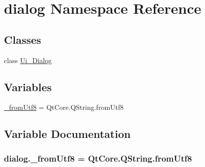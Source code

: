 \hypertarget{namespacedialog}{}\section{dialog Namespace Reference}
\label{namespacedialog}
\subsection*{Classes}
\begin{DoxyCompactItemize}
\item 
class \hyperlink{classdialog_1_1Ui__Dialog}{Ui\+\_\+\+Dialog}
\end{DoxyCompactItemize}
\subsection*{Variables}
\begin{DoxyCompactItemize}
\item 
\hyperlink{namespacedialog_a90d934f74bf26c84953771b7c64b498e}{\+\_\+from\+Utf8} = Qt\+Core.\+Q\+String.\+from\+Utf8
\end{DoxyCompactItemize}


\subsection{Variable Documentation}
\hypertarget{namespacedialog_a90d934f74bf26c84953771b7c64b498e}{}
\subsubsection[{\+\_\+from\+Utf8}]{\setlength{\rightskip}{0pt plus 5cm}dialog.\+\_\+from\+Utf8 = Qt\+Core.\+Q\+String.\+from\+Utf8}\label{namespacedialog_a90d934f74bf26c84953771b7c64b498e}

